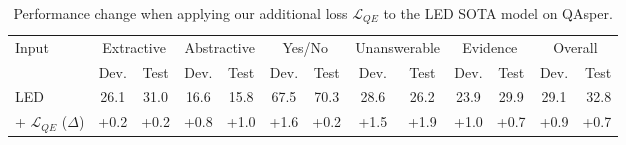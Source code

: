 \begin{table*}[t]
\footnotesize
\centering
\renewcommand{\arraystretch}{1.}
\begin{tabular}{@{}lcccccccc|cc|cr@{}}
\toprule
\multirow{2}{*}{Input} & \multicolumn{2}{c}{Extractive} & \multicolumn{2}{c}{Abstractive} & \multicolumn{2}{c}{Yes/No} & \multicolumn{2}{c}{Unanswerable} &
\multicolumn{2}{c}{Evidence} & \multicolumn{2}{c}{Overall} \\
& Dev. & Test & Dev. & Test & Dev. & Test & Dev. & Test & Dev. & Test & Dev. & Test \\
\midrule
LED     \citeyearpar{longformer}                    & 26.1 & 31.0 & 16.6 & 15.8 & 67.5 & 70.3 & 28.6 & 26.2 & 23.9  & 29.9& 29.1&  32.8\\
+ $\mathcal{L}_{QE}$ ($\Delta$)  & +0.2 & +0.2 & +0.8 & +1.0 & +1.6 & +0.2 & +1.5 & +1.9 & +1.0 & +0.7 & +0.9 & +0.7 \\
\bottomrule
\end{tabular}
\caption{Performance change when applying our additional loss $\mathcal{L}_{QE}$ to the LED SOTA model on QAsper.} %
\label{tab:qasper_results}
\end{table*}
